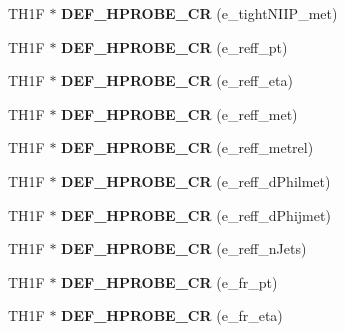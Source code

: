 \begin{DoxyCompactItemize}
\item 
\hypertarget{classHistos__Fake_a06d1d0c185e3bef099ad79f1d492e7fa}{
TH1F $\ast$ {\bfseries DEF\_\-HPROBE\_\-CR} (e\_\-tightNIIP\_\-met)}
\label{classHistos__Fake_a06d1d0c185e3bef099ad79f1d492e7fa}

\item 
\hypertarget{classHistos__Fake_a6aefc729980cc3ddc39b783f221f2612}{
TH1F $\ast$ {\bfseries DEF\_\-HPROBE\_\-CR} (e\_\-reff\_\-pt)}
\label{classHistos__Fake_a6aefc729980cc3ddc39b783f221f2612}

\item 
\hypertarget{classHistos__Fake_a58f4c4abfb73cd4eb3b4e0d60f49ab6c}{
TH1F $\ast$ {\bfseries DEF\_\-HPROBE\_\-CR} (e\_\-reff\_\-eta)}
\label{classHistos__Fake_a58f4c4abfb73cd4eb3b4e0d60f49ab6c}

\item 
\hypertarget{classHistos__Fake_ae973fb4d34a6c8a4dfdcbe6eb1f5cd31}{
TH1F $\ast$ {\bfseries DEF\_\-HPROBE\_\-CR} (e\_\-reff\_\-met)}
\label{classHistos__Fake_ae973fb4d34a6c8a4dfdcbe6eb1f5cd31}

\item 
\hypertarget{classHistos__Fake_afff82795d3e5a3d7061eb5dec2083e75}{
TH1F $\ast$ {\bfseries DEF\_\-HPROBE\_\-CR} (e\_\-reff\_\-metrel)}
\label{classHistos__Fake_afff82795d3e5a3d7061eb5dec2083e75}

\item 
\hypertarget{classHistos__Fake_a85c1bd797d136a61173cc3135a7cad97}{
TH1F $\ast$ {\bfseries DEF\_\-HPROBE\_\-CR} (e\_\-reff\_\-dPhilmet)}
\label{classHistos__Fake_a85c1bd797d136a61173cc3135a7cad97}

\item 
\hypertarget{classHistos__Fake_a36fba4f9684560101fcbf5a024ac4677}{
TH1F $\ast$ {\bfseries DEF\_\-HPROBE\_\-CR} (e\_\-reff\_\-dPhijmet)}
\label{classHistos__Fake_a36fba4f9684560101fcbf5a024ac4677}

\item 
\hypertarget{classHistos__Fake_aca73bfe2e1d7d44cc424fd339766ab12}{
TH1F $\ast$ {\bfseries DEF\_\-HPROBE\_\-CR} (e\_\-reff\_\-nJets)}
\label{classHistos__Fake_aca73bfe2e1d7d44cc424fd339766ab12}

\item 
\hypertarget{classHistos__Fake_acb31cba517e6c2bbe99ea78b2a2a3ebe}{
TH1F $\ast$ {\bfseries DEF\_\-HPROBE\_\-CR} (e\_\-fr\_\-pt)}
\label{classHistos__Fake_acb31cba517e6c2bbe99ea78b2a2a3ebe}

\item 
\hypertarget{classHistos__Fake_a14230ea70a6f8d82f71fb09766b67972}{
TH1F $\ast$ {\bfseries DEF\_\-HPROBE\_\-CR} (e\_\-fr\_\-eta)}
\label{classHistos__Fake_a14230ea70a6f8d82f71fb09766b67972}


\end{DoxyCompactItemize}
